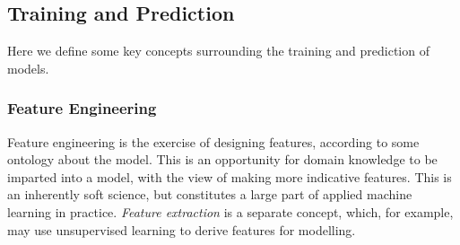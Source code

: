 \documentclass[11pt]{amsart}
\begin{document}
%
%
%
%
%

\subsection{Training and Prediction}

Here we define some key concepts surrounding the training and prediction of models.

\subsubsection{Feature Engineering} Feature engineering is the exercise of designing features, according to some ontology about the model. This is an opportunity for domain knowledge to be imparted into a model, with the view of making more indicative features. This is an inherently soft science, but constitutes a large part of applied machine learning in practice. \emph{Feature extraction} is a separate concept, which, for example, may use unsupervised learning to derive features for modelling.
\end{document}
